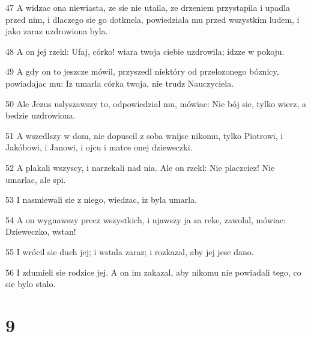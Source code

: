 \par 47 A widzac ona niewiasta, ze sie nie utaila, ze drzeniem przystapila i upadla przed nim, i dlaczego sie go dotknela, powiedziala mu przed wszystkim ludem, i jako zaraz uzdrowiona byla.
\par 48 A on jej rzekl: Ufaj, córko! wiara twoja ciebie uzdrowila; idzze w pokoju.
\par 49 A gdy on to jeszcze mówil, przyszedl niektóry od przelozonego bóznicy, powiadajac mu: Iz umarla córka twoja, nie trudz Nauczyciela.
\par 50 Ale Jezus uslyszawszy to, odpowiedzial mu, mówiac: Nie bój sie, tylko wierz, a bedzie uzdrowiona.
\par 51 A wszedlszy w dom, nie dopuscil z soba wnijsc nikomu, tylko Piotrowi, i Jakóbowi, i Janowi, i ojcu i matce onej dzieweczki.
\par 52 A plakali wszyscy, i narzekali nad nia. Ale on rzekl: Nie placzciez! Nie umarlac, ale spi.
\par 53 I nasmiewali sie z niego, wiedzac, iz byla umarla.
\par 54 A on wygnawszy precz wszystkich, i ujawszy ja za reke, zawolal, mówiac: Dzieweczko, wstan!
\par 55 I wrócil sie duch jej; i wstala zaraz; i rozkazal, aby jej jesc dano.
\par 56 I zdumieli sie rodzice jej. A on im zakazal, aby nikomu nie powiadali tego, co sie bylo stalo.

\chapter{9}

